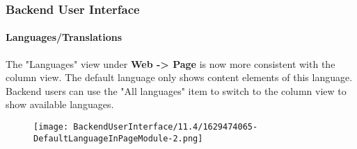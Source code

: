 %

\begin{frame}[fragile]
	\frametitle{Backend User Interface}
	\framesubtitle{Languages/Translations}

	The "Languages" view under \textbf{Web -> Page} is now more consistent with
	the column view. The default language only shows content elements of this
	language. Backend users can use the "All languages" item to switch to the
	column view to show available languages.

	\begin{figure}
		\texttt{[image: BackendUserInterface/11.4/1629474065-DefaultLanguageInPageModule-2.png]}
	\end{figure}

\end{frame}

